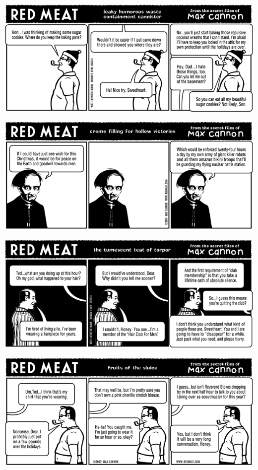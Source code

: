 \documentclass[a4paper,twoside,11pt]{article}
\begin{document}
\includegraphics[width=\textwidth]{redmeat_2001-12-25.png}



\includegraphics[width=\textwidth]{redmeat_2002-01-01.png}



\includegraphics[width=\textwidth]{redmeat_2002-01-08.png}



\includegraphics[width=\textwidth]{redmeat_2002-01-15.png}
\end{document}
